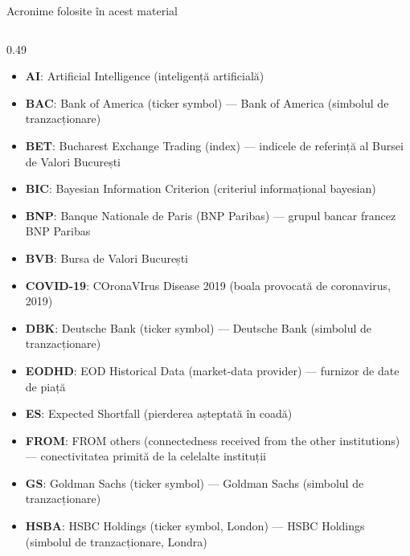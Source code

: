 
{
\begin{frame}[noframenumbering]
    \titlepage
\end{frame}
}
\begin{frame}{Acronime folosite în acest material}
\begin{columns}[T]
\begin{column}{0.49\textwidth}
\begin{itemize}\setlength{\itemsep}{0pt}
    \item \textbf{AI}: Artificial Intelligence (inteligență artificială)
    \item \textbf{BAC}: Bank of America (ticker symbol) — Bank of America (simbolul de tranzacționare)
    \item \textbf{BET}: Bucharest Exchange Trading (index) — indicele de referință al Bursei de Valori București
    \item \textbf{BIC}: Bayesian Information Criterion (criteriul informațional bayesian)
    \item \textbf{BNP}: Banque Nationale de Paris (BNP Paribas) — grupul bancar francez BNP Paribas
    \item \textbf{BVB}: Bursa de Valori București
    \item \textbf{COVID-19}: COronaVIrus Disease 2019 (boala provocată de coronavirus, 2019)
    \item \textbf{DBK}: Deutsche Bank (ticker symbol) — Deutsche Bank (simbolul de tranzacționare)
    \item \textbf{EODHD}: EOD Historical Data (market-data provider) — furnizor de date de piață
    \item \textbf{ES}: Expected Shortfall (pierderea așteptată în coadă)
    \item \textbf{FROM}: FROM others (connectedness received from the other institutions) — conectivitatea primită de la celelalte instituții
    \item \textbf{GS}: Goldman Sachs (ticker symbol) — Goldman Sachs (simbolul de tranzacționare)
    \item \textbf{HSBA}: HSBC Holdings (ticker symbol, London) — HSBC Holdings (simbolul de tranzacționare, Londra)
\end{itemize}
\end{column}

\end{columns}
\end{frame}
